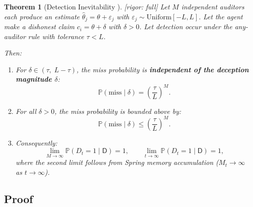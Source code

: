 \documentclass[11pt,a4paper]{article}
\newtheorem{theorem}{Theorem}[section]
\theoremstyle{definition}
\theoremstyle{remark}
\newcommand{\rigorFull}{\textcolor{green!60!black}{[rigor: full]}}
\newcommand{\Pbb}{\mathbb{P}}
\newcommand{\dishonest}{\mathsf{D}}
\newcommand{\claim}{c}
\newcommand{\truth}{\theta}
\newcommand{\deception}{\delta}
\newcommand{\threshold}{\tau}
\newcommand{\tol}{L}
\begin{document}
\begin{theorem}[Detection Inevitability ]
\label{thm:inevitability}
\rigorFull
Let $M$ independent auditors each produce an estimate $\hat{\theta}_j = \truth + \varepsilon_j$ with $\varepsilon_j \sim \text{Uniform}[-\tol, \tol]$. Let the agent make a dishonest claim $\claim_i = \truth + \deception$ with $\deception > 0$. Let detection occur under the any-auditor rule with tolerance $\threshold < \tol$.

Then:
\begin{enumerate}[label=(\roman*)]
    \item For $\deception \in (\threshold,\; \tol - \threshold)$, the miss probability is \textbf{independent of the deception magnitude $\deception$}:
    \begin{equation}
        \Pbb(\text{miss} \mid \deception) = \left(\frac{\threshold}{\tol}\right)^M.
        \label{eq:miss_bound}
    \end{equation}
    \item For all $\deception > 0$, the miss probability is bounded above by:
    \begin{equation}
        \Pbb(\text{miss} \mid \deception) \leq \left(\frac{\threshold}{\tol}\right)^M.
        \label{eq:miss_bound_general}
    \end{equation}
    \item Consequently:
    \begin{equation}
        \lim_{M \to \infty} \Pbb(D_t = 1 \mid \dishonest) = 1,
        \qquad
        \lim_{t \to \infty} \Pbb(D_t = 1 \mid \dishonest) = 1,
    \end{equation}
    where the second limit follows from Spring memory accumulation ($M_t \to \infty$ as $t \to \infty$).
\end{enumerate}
\end{theorem}

\subsection{Proof}
\end{document}
